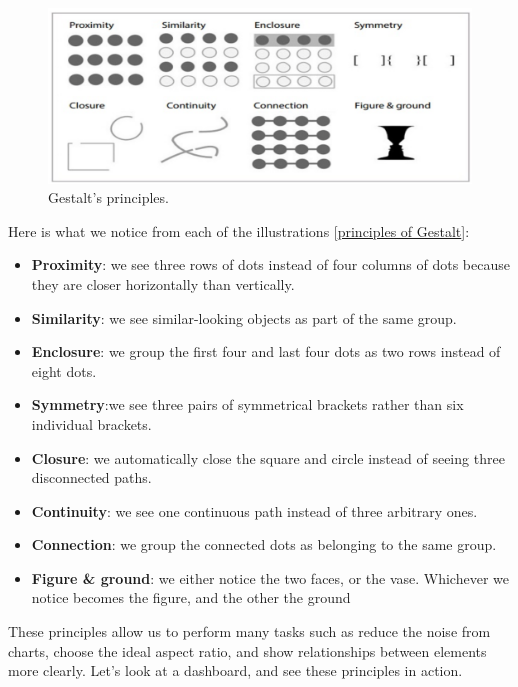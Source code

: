 \begin{figure}[H]%
 \centering
 \includegraphics[width=13cm]{./img/06/gestalt}
 \caption{\label{pic:gestalt} Gestalt's principles.}
\end{figure}

Here is what we notice from each of the illustrations [\href{http://www.fusioncharts.com/blog/2014/03/how-to-use-the-gestalt-principles-for-visual-storytelling-podv/}{principles of Gestalt}]:

\begin{itemize}

\item \textbf{Proximity}: we see three rows of dots instead of four columns of dots because they are closer horizontally than vertically.
\item \textbf{Similarity}: we see similar-looking objects as part of the same group.
\item \textbf{Enclosure}: we group the first four and last four dots as two rows instead of eight dots.
\item \textbf{Symmetry}:we see three pairs of symmetrical brackets rather than six individual brackets.
\item \textbf{Closure}: we automatically close the square and circle instead of seeing three disconnected paths.
\item \textbf{Continuity}: we see one continuous path instead of three arbitrary ones.
\item \textbf{Connection}: we group the connected dots as belonging to the same group.
\item \textbf{Figure \& ground}: we either notice the two faces, or the vase. Whichever we notice becomes the figure, and the other the ground

\end{itemize}

These principles allow us to perform many tasks such as reduce the noise from charts, choose the ideal aspect ratio, and show relationships between elements more clearly. Let's look at a dashboard, and see these principles in action.

